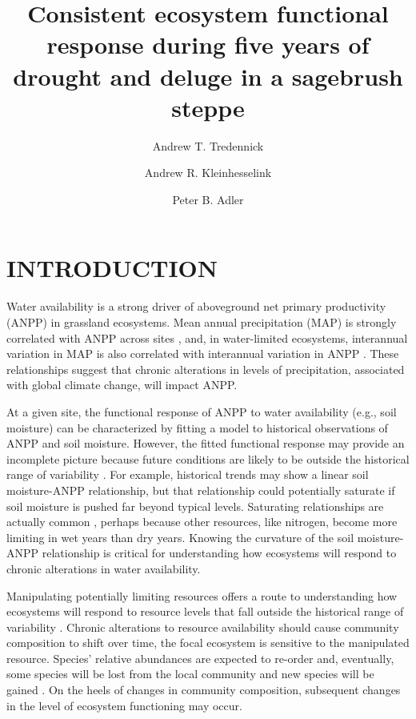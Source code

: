 \documentclass[fleqn,10pt]{wlpeerj} %
\title{Consistent ecosystem functional response during five years of drought
and deluge in a sagebrush steppe}
\author[1]{Andrew T. Tredennick}
\author[2]{Andrew R. Kleinhesselink}
\author[1]{Peter B. Adler}
\affil[1]{Department of Wildland Resources and the Ecology Center, Utah State
University, Logan, Utah 84322}
\affil[2]{Department of Ecology and Evolutionary Biology, University of
California, Los Angeles, Los Angeles, California xxxxx}
\begin{document}
\flushbottom
\maketitle
\thispagestyle{empty}

 
\newcommand{\pba}{\textcolor{blue}} \newcommand{\ark}{\textcolor{red}}

\section{INTRODUCTION}\label{introduction}

Water availability is a strong driver of aboveground net primary
productivity (ANPP) in grassland ecosystems. Mean annual precipitation
(MAP) is strongly correlated with ANPP across sites \citep{Huxman2004},
and, in water-limited ecosystems, interannual variation in MAP is also
correlated with interannual variation in ANPP \citep{Hsu2012}. These
relationships suggest that chronic alterations in levels of
precipitation, associated with global climate change, will impact ANPP.

At a given site, the functional response of ANPP to water availability
(e.g., soil moisture) can be characterized by fitting a model to
historical observations of ANPP and soil moisture. However, the fitted
functional response may provide an incomplete picture because future
conditions are likely to be outside the historical range of variability
\citep{Smith2011}. For example, historical trends may show a linear soil
moisture-ANPP relationship, but that relationship could potentially
saturate if soil moisture is pushed far beyond typical levels.
Saturating relationships are actually common \citep{Hsu2012}, perhaps
because other resources, like nitrogen, become more limiting in wet
years than dry years. Knowing the curvature of the soil moisture-ANPP
relationship is critical for understanding how ecosystems will respond
to chronic alterations in water availability.

Manipulating potentially limiting resources offers a route to
understanding how ecosystems will respond to resource levels that fall
outside the historical range of variability \citep{Knapp2017}. Chronic
alterations to resource availability should cause community composition
to shift over time, the focal ecosystem is sensitive to the manipulated
resource. Species' relative abundances are expected to re-order and,
eventually, some species will be lost from the local community and new
species will be gained \citep{Smith2009, Avolio2015}. On the heels of
changes in community composition, subsequent changes in the level of
ecosystem functioning may occur.
\end{document}
